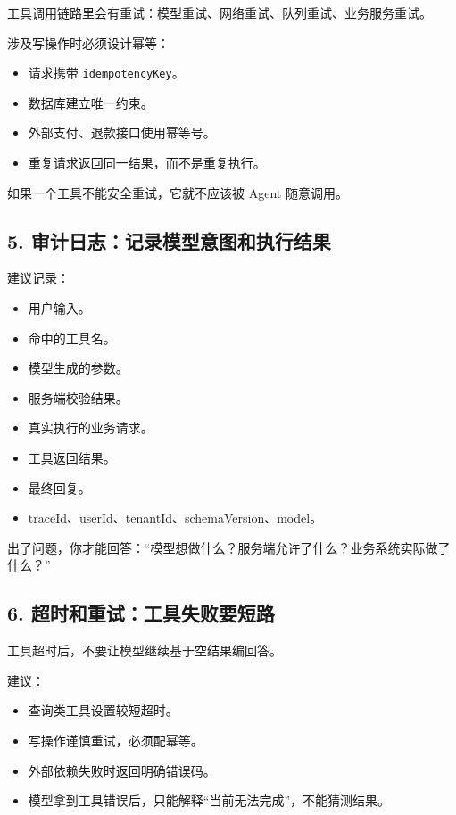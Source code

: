 \documentclass[10pt,a4paper]{ctexart}
\begin{document}
工具调用链路里会有重试：模型重试、网络重试、队列重试、业务服务重试。



涉及写操作时必须设计幂等：


\begin{itemize}[itemsep=2pt, topsep=4pt]
  \item 请求携带 \texttt{idempotencyKey}。
  \item 数据库建立唯一约束。
  \item 外部支付、退款接口使用幂等号。
  \item 重复请求返回同一结果，而不是重复执行。
\end{itemize}


如果一个工具不能安全重试，它就不应该被 Agent 随意调用。



\subsection{5. 审计日志：记录模型意图和执行结果}


建议记录：


\begin{itemize}[itemsep=2pt, topsep=4pt]
  \item 用户输入。
  \item 命中的工具名。
  \item 模型生成的参数。
  \item 服务端校验结果。
  \item 真实执行的业务请求。
  \item 工具返回结果。
  \item 最终回复。
  \item traceId、userId、tenantId、schemaVersion、model。
\end{itemize}


出了问题，你才能回答：“模型想做什么？服务端允许了什么？业务系统实际做了什么？”



\subsection{6. 超时和重试：工具失败要短路}


工具超时后，不要让模型继续基于空结果编回答。



建议：


\begin{itemize}[itemsep=2pt, topsep=4pt]
  \item 查询类工具设置较短超时。
  \item 写操作谨慎重试，必须配幂等。
  \item 外部依赖失败时返回明确错误码。
  \item 模型拿到工具错误后，只能解释“当前无法完成”，不能猜测结果。
\end{itemize}
\end{document}
